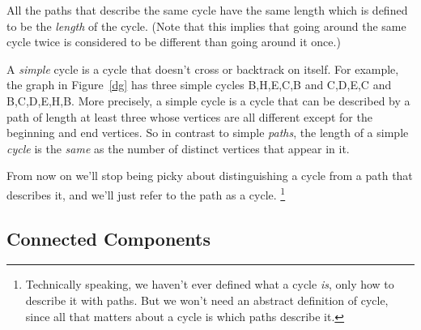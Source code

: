 All the paths that describe the same cycle have the same length which is
defined to be the {\em length} of the cycle.  (Note that this implies that
going around the same cycle twice is considered to be different than going
around it once.)

A \emph{simple} cycle is a cycle that doesn't cross or backtrack on
itself.  For example, the graph in Figure~\ref{dg} has three simple cycles
B,H,E,C,B and C,D,E,C and B,C,D,E,H,B.  More precisely, a simple cycle is
a cycle that can be described by a path of length at least three whose
vertices are all different except for the beginning and end vertices.  So
in contrast to simple \emph{paths}, the length of a simple \emph{cycle} is
the \emph{same} as the number of distinct vertices that appear in it.

From now on we'll stop being picky about distinguishing a cycle from a
path that describes it, and we'll just refer to the path as a cycle.
\footnote{Technically speaking, we haven't ever defined what a cycle
\emph{is}, only how to describe it with paths.  But we won't need an
abstract definition of cycle, since all that matters about a cycle is which
paths describe it.}

\iffalse

Simple cycles are especially important, so we will give a proper
definition of them.  Namely, we'll define a simple cycle in $G$ to be a
\emph{subgraph} of $G$ that looks like a cycle that doesn't cross itself.
Formally:

\begin{definition}
A \term{subgraph}, $G'$, of a graph, $G$, is a graph whose vertices, $V'$,
are a subset of the vertices of $G$ and whose edges are a subset
of the edges of $G$.
\end{definition}
Notice that since a subgraph is itself a graph, the endpoints of every
edge of $G'$ must be vertices in $V'$.

\begin{definition}
For $n \ge 3$, let $C_n$ be the graph with vertices $1,\dots, n$ and
edges
\[
\edge{1}{2},\ \ \edge{2}{3},\ \ \dots,\ \ \edge{(n-1)}{n},\ \ \edge{n}{1}.
\]
 graph is a \term{simple cycle of length $n$} iff it is isomorphic to
$C_n$ for some $n \ge 3$.  A \term{simple cycle of a graph}, $G$, is a
subgraph of $G$ that is a simple cycle.
\end{definition}
\fi


\subsection{Connected Components}


